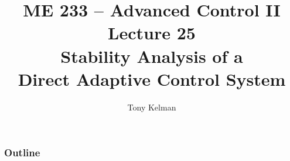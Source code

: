 \documentclass[handout,mathserif]{beamer}       %
\title{ME 233 -- Advanced Control II\\
    Lecture 25 \\
    Stability Analysis of a \\
    Direct Adaptive Control System}
\author{Tony Kelman}
\institute{UC Berkeley}
\begin{document}
\maketitle

\begin{frame}
    \frametitle{Outline}
    \tableofcontents
\end{frame}









\end{document}
